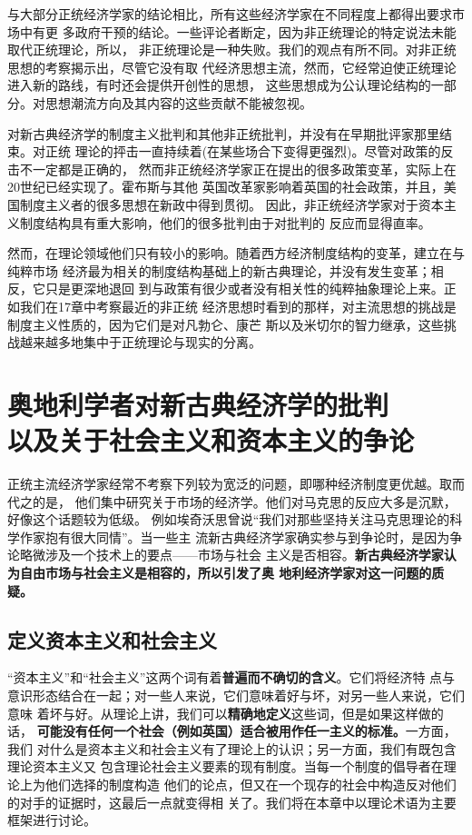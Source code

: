 与大部分正统经济学家的结论相比，所有这些经济学家在不同程度上都得出要求市场中有更
多政府干预的结论。一些评论者断定，因为非正统理论的特定说法未能取代正统理论，所以，
非正统理论是一种失败。我们的观点有所不同。对非正统思想的考察揭示出，尽管它没有取
代经济思想主流，然而，它经常迫使正统理论进入新的路线，有时还会提供开创性的思想，
这些思想成为公认理论结构的一部分。对思想潮流方向及其内容的这些贡献不能被忽视。

对新古典经济学的制度主义批判和其他非正统批判，并没有在早期批评家那里结束。对正统
理论的抨击一直持续着(在某些场合下变得更强烈)。尽管对政策的反击不一定都是正确的，
然而非正统经济学家正在提出的很多政策变革，实际上在20世纪已经实现了。霍布斯与其他
英国改革家影响着英国的社会政策，并且，美国制度主义者的很多思想在新政中得到贯彻。
因此，非正统经济学家对于资本主义制度结构具有重大影响，他们的很多批判由于对批判的
反应而显得直率。

然而，在理论领域他们只有较小的影响。随着西方经济制度结构的变革，建立在与纯粹市场
经济最为相关的制度结构基础上的新古典理论，并没有发生变革；相反，它只是更深地退回
到与政策有很少或者没有相关性的纯粹抽象理论上来。正如我们在17章中考察最近的非正统
经济思想时看到的那样，对主流思想的挑战是制度主义性质的，因为它们是对凡勃仑、康芒
斯以及米切尔的智力继承，这些挑战越来越多地集中于正统理论与现实的分离。

\chapter{奥地利学者对新古典经济学的批判\\以及关于社会主义和资本主义的争论}


正统主流经济学家经常不考察下列较为宽泛的问题，即哪种经济制度更优越。取而代之的是，
他们集中研究关于市场的经济学。他们对马克思的反应大多是沉默，好像这个话题较为低级。
例如埃奇沃思曾说“我们对那些坚持关注马克思理论的科学作家抱有很大同情”。当一些主
流新古典经济学家确实参与到争论时，是因为争论略微涉及一个技术上的要点——市场与社会
主义是否相容。\textbf{新古典经济学家认为自由市场与社会主义是相容的，所以引发了奥
地利经济学家对这一问题的质疑。}

\section{定义资本主义和社会主义}

“资本主义”和“社会主义”这两个词有着\textbf{普遍而不确切的含义}。它们将经济特
点与意识形态结合在一起；对一些人来说，它们意味着好与坏，对另一些人来说，它们意味
着坏与好。从理论上讲，我们可以\textbf{精确地定义}这些词，但是如果这样做的话，
\textbf{可能没有任何一个社会（例如英国）适合被用作任一主义的标准。}一方面，我们
对什么是资本主义和社会主义有了理论上的认识；另一方面，我们有既包含理论资本主义又
包含理论社会主义要素的现有制度。当每一个制度的倡导者在理论上为他们选择的制度构造
他们的论点，但又在一个现存的社会中构造反对他们的对手的证据时，这最后一点就变得相
关了。我们将在本章中以理论术语为主要框架进行讨论。

